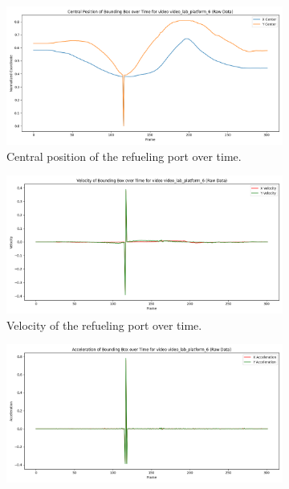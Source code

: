 \documentclass[12pt,oneside]{book} %
\begin{document}
\begin{figure}[H]
    \centering
    \begin{subfigure}[t]{0.6\textwidth}
        \includegraphics[width=\textwidth]{figures/bbox_metrics/video_lab_platform_6 (Raw Data)_central_position.png}
        \caption{Central position of the refueling port over time.}
        \label{fig:central-position-test-video_lab_platform_6}
    \end{subfigure}
    \hfill
    \begin{subfigure}[t]{0.6\textwidth}
        \includegraphics[width=\textwidth]{figures/bbox_metrics/video_lab_platform_6 (Raw Data)_velocity.png}
        \caption{Velocity of the refueling port over time.}
        \label{fig:velocity-test-video_lab_platform_6}
    \end{subfigure}
    \vfill
    \begin{subfigure}[t]{0.6\textwidth}
        \includegraphics[width=\textwidth]{figures/bbox_metrics/video_lab_platform_6 (Raw Data)_acceleration.png}

\end{subfigure}
\end{figure}
\end{document}

